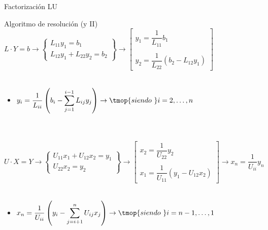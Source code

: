 \documentclass [8pt] {beamer}
\begin{document}
        \begin{frame}{Factorización LU}
            \begin{block}{Algoritmo de resolución (y II)}
                {$ L\cdot Y = b \rightarrow \left\{ \begin{array}{l}
                L_{11} y_1 = b_1  \\
                L_{12} y_1 + L_{22} y_2 = b_2
                \end{array} \right\} \rightarrow \left[ \begin{array}{l}
                y_1 = \dfrac{1}{L_{11}} b_1 \\ \ \\
                y_2 = \dfrac{1}{L_{22}} \left( b_2 - L_{12} y_1 \right) 
                \end{array} \right] $} \\ \ \\
                \begin{itemize}
                    \item  {$y_i = \dfrac{1}{L_{i i}}  \left( b_i - \displaystyle\sum_{j = 1}^{i - 1} L_{i j} y_j
                    \right) \rightarrow \tmop{siendo \ } i = 2, \ldots, n$ \\ \ \\ \ \\ }
                \end{itemize}
                {$ U\cdot X = Y \rightarrow \left\{ \begin{array}{l}
                U_{11} x_1 + U_{12} x_2 = y_1 \\
                U_{22} x_2 = y_2
                \end{array} \right\} \rightarrow
                \left[ \begin{array}{l}
                x_2 = \dfrac{1}{U_{22}} y_2 \\ \ \\
                x_1 = \dfrac{1}{U_{11}} \left( y_1 - U_{12} x_2 \right) 
                \end{array} \right]
                \rightarrow x_n = \dfrac{1}{U_{i i}} y_n$}\\ \ \\
                \begin{itemize}
                    \item {$x_n = \dfrac{1}{U_{i i}}  \left( y_i - \displaystyle\sum_{j = i + 1}^n U_{i j} x_j \right)
                    \rightarrow \tmop{siendo \ } i = n - 1, \ldots, 1$}
                \end{itemize}
            \end{block}
        \end{frame}
\end{document}
